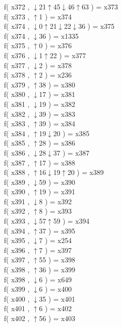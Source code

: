 f( x372 , $\downarrow$21$\uparrow$45$\downarrow$46$\uparrow$63 ) = x373 \\
f( x373 , $\uparrow$1 ) = x374 \\
f( x374 , $\downarrow$0$\uparrow$21$\downarrow$22$\downarrow$36 ) = x375 \\
f( x374 , $\downarrow$36 ) = x1335 \\
f( x375 , $\uparrow$0 ) = x376 \\
f( x376 , $\downarrow$1$\uparrow$22 ) = x377 \\
f( x377 , $\downarrow$2 ) = x378 \\
f( x378 , $\uparrow$2 ) = x236 \\
f( x379 , $\uparrow$38 ) = x380 \\
f( x380 , $\downarrow$17 ) = x381 \\
f( x381 , $\downarrow$19 ) = x382 \\
f( x382 , $\downarrow$39 ) = x383 \\
f( x383 , $\uparrow$39 ) = x384 \\
f( x384 , $\uparrow$19$\downarrow$20 ) = x385 \\
f( x385 , $\uparrow$28 ) = x386 \\
f( x386 , $\downarrow$28$\downarrow$37 ) = x387 \\
f( x387 , $\uparrow$17 ) = x388 \\
f( x388 , $\uparrow$16$\downarrow$19$\uparrow$20 ) = x389 \\
f( x389 , $\downarrow$59 ) = x390 \\
f( x390 , $\uparrow$19 ) = x391 \\
f( x391 , $\downarrow$8 ) = x392 \\
f( x392 , $\uparrow$8 ) = x393 \\
f( x393 , $\downarrow$57$\uparrow$59 ) = x394 \\
f( x394 , $\uparrow$37 ) = x395 \\
f( x395 , $\downarrow$7 ) = x254 \\
f( x396 , $\uparrow$7 ) = x397 \\
f( x397 , $\uparrow$55 ) = x398 \\
f( x398 , $\uparrow$36 ) = x399 \\
f( x398 , $\downarrow$6 ) = x649 \\
f( x399 , $\downarrow$6 ) = x400 \\
f( x400 , $\downarrow$35 ) = x401 \\
f( x401 , $\uparrow$6 ) = x402 \\
f( x402 , $\uparrow$56 ) = x403 \\
